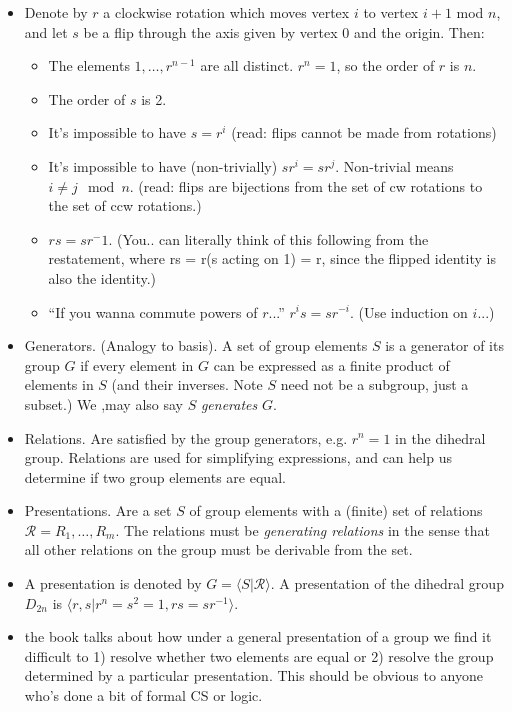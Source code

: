 \documentclass[1    0pt, answers]{exam} \renewcommand{\baselinestretch}{1.05}
\theoremstyle{plain}
\theoremstyle{definition}
\begin{document}
\begin{questions}
\begin{itemize}
    \item Denote by $r$ a clockwise rotation which moves vertex $i$ to vertex $i + 1$ mod $n$, and let $s$ be a flip through the axis given by vertex 0 and the origin. Then:
    \begin{itemize}
        \item The elements $1, \ldots, r^{n-1}$ are all distinct. $r^n = 1$, so the order of $r$ is $n$.
        \item The order of $s$ is 2.
        \item It's impossible to have $s = r^i$ (read: flips cannot be made from rotations)
        \item It's impossible to have (non-trivially) $sr^i = sr^j$. Non-trivial means $i \neq j \mod n$. (read: flips are bijections from the set of cw rotations to the set of ccw rotations.)
        \item $rs = sr^-1$. (You.. can literally think of this following from the restatement, where rs = r(s acting on 1) = r, since the flipped identity is also the identity.)
        \item ``If you wanna commute powers of $r$...'' $r^is = sr^{-i}$. (Use induction on $i$...)
    \end{itemize}
    \item Generators. (Analogy to basis). A set of group elements $S$ is a generator of its group $G$ if every element in $G$ can be expressed as a finite product of elements in $S$ (and their inverses. Note $S$ need not be a subgroup, just a subset.) We ,may also say $S$ \emph{generates} $G$.
    \item Relations. Are satisfied by the group generators, e.g. $r^n = 1$ in the dihedral group. Relations are used for simplifying expressions, and can help us determine if two group elements are equal.
    \item Presentations. Are a set $S$ of group elements with a (finite) set of relations $\mathcal{R} = R_1, \ldots, R_m$. The relations must be \emph{generating relations} in the sense that all other relations on the group must be derivable from the set.
    \item A presentation is denoted by $G = \langle S | \mathcal{R} \rangle$. A presentation of the dihedral group $D_{2n}$ is $\langle r, s | r^n = s^2 = 1, rs = sr^{-1} \rangle$. 
    \item the book talks about how under a general presentation of a group we find it difficult to 1) resolve whether two elements are equal or 2) resolve the group determined by a particular presentation. This should be obvious to anyone who's done a bit of formal CS or logic.
\end{itemize}


\end{questions}
\end{document}
